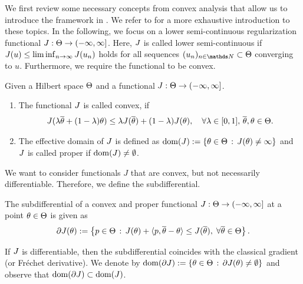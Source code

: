 We first review some necessary concepts from convex analysis that allow us to introduce the framework in \cite{bungert2022bregman}. We refer to \cite{benning2018modern, rockafellar1997convex, bauschke2011convex} for a more exhaustive introduction to these topics.
%
In the following, we focus on a lower semi-continuous regularization functional $J:\Theta\to (-\infty,\infty]$. Here, $J$ is called lower semi-continuous if $J(u)\leq\liminf_{n\to\infty}J(u_n)$ holds for all sequences $(u_n)_{n\in\N}\subset\Param$ converging to $u$. Furthermore, we require the functional to be convex.
%
\begin{definition}{}{}
Given a Hilbert space $\Theta$ and a functional $J:\Theta\to(-\infty,\infty]$.
%
\begin{enumerate}
\item The functional $J$ is called convex, if
%
\begin{align}
    J(\lambda\overline{\theta}+(1-\lambda)\theta)\leq
    \lambda J(\overline{\theta})
    +(1-\lambda)J(\theta),\quad\forall\lambda\in[0,1],\,\overline{\theta},\theta\in\Theta.
\end{align}
%
\item The effective domain of $J$ is defined as $\operatorname{dom}(J):=\{\theta\in\Theta\,:\,J(\theta)\neq\infty\}$ and $J$ is called proper if $\operatorname{dom}(J)\neq\emptyset$.
\end{enumerate} 
\end{definition}
%
%
\noindent%
We want to consider functionals $J$ that are convex, but not necessarily differentiable. Therefore, we define the subdifferential.
%
\begin{definition}{}{}
The subdifferential of a convex {and proper} functional $J:\Theta\to(-\infty,\infty]$ at a point $\theta\in\Theta$ is given as
\begin{align}
\label{eq:subgrad}
    \partial J(\theta) := \left\lbrace p\in\Theta \,:\, J(\theta) + \langle p,\overline{\theta}-\theta \rangle \leq J(\overline{\theta}),\;\forall\overline{\theta}\in\Theta\right\rbrace.
\end{align}
\end{definition}
\noindent%
If $J$ is differentiable, then the subdifferential coincides with the classical gradient (or Fr\'echet derivative). We denote by $\operatorname{dom}(\partial J):=\{\theta\in\Theta\,:\,\partial J(\theta)\neq\emptyset\}$ and observe that $\operatorname{dom}(\partial J)\subset\operatorname{dom}(J)$.

